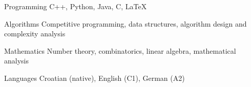 %
%

\begin{cvskills}

  \cvskill
    {Programming} %
    {C++, Python, Java, C, LaTeX} %

  \cvskill
    {Algorithms} %
    {Competitive programming, data structures, algorithm design and complexity analysis} %

  \cvskill
    {Mathematics} %
    {Number theory, combinatorics, linear algebra, mathematical analysis} %

  \cvskill
    {Languages} %
    {Croatian (native), English (C1), German (A2)} %

\end{cvskills}
